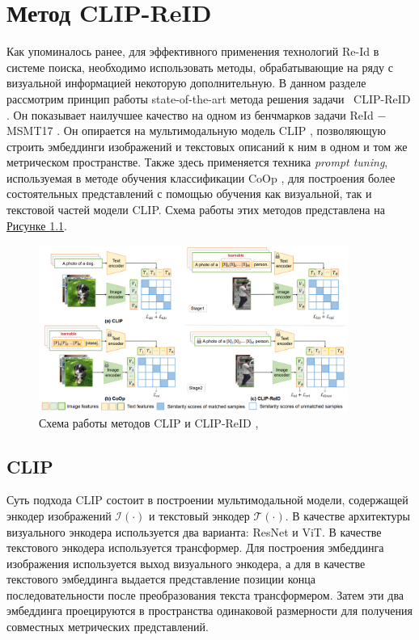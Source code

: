 \chapter{Метод CLIP-ReID}
\label{ch:clipreid}

Как упоминалось ранее, для эффективного применения технологий Re-Id в системе поиска, необходимо использовать методы, обрабатывающие на ряду с визуальной информацией некоторую дополнительную. В данном разделе рассмотрим принцип работы state-of-the-art метода решения задачи \reid\ CLIP-ReID \cite{li2023clip}. Он показывает наилучшее качество на одном из бенчмарков задачи ReId $-$ MSMT17 \cite{wei2018person}. Он опирается на мультимодальную модель CLIP \cite{radford2021learning}, позволяющую строить эмбеддинги изображений и текстовых описаний к ним в одном и том же метрическом пространстве. Также здесь применяется техника \textit{prompt tuning}, используемая в методе обучения классификации CoOp \cite{zhou2022learning}, для построения более состоятельных представлений с помощью обучения как визуальной, так и текстовой частей модели CLIP. Схема работы этих методов представлена на \hyperref[fig:clipreid]{Рисунке \ref*{fig:clipreid}}.

\begin{figure}[ht]
	\centering
	\includegraphics[width=0.9\textwidth]{images/clipreid/scheme.png}
	\caption{Схема работы методов CLIP и CLIP-ReID \cite{radford2021learning}, \cite{li2023clip}}
	\label{fig:clipreid}
\end{figure}


\section{CLIP}

Суть подхода CLIP состоит в построении мультимодальной модели, содержащей энкодер изображений $\mathcal I(\cdot)$ и текстовый энкодер $\mathcal T(\cdot )$. В качестве архитектуры визуального энкодера используется два варианта: ResNet и ViT. В качестве текстового энкодера используется трансформер. Для построения эмбеддинга изображения используется выход визуального энкодера, а для в качестве текстового эмбеддинга выдается представление позиции конца последовательности после преобразования текста трансформером. Затем эти два эмбеддинга проецируются в пространства одинаковой размерности для получения совместных метрических представлений.

